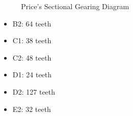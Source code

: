 \documentclass[11pt, oneside]{article}   	%
\theoremstyle{definition}
\begin{document}
\bigskip
\begin{figure}[H]
  \caption{Price's Sectional Gearing Diagram \cite{gears_from_the_greeks}}
  \label{fig:sectional_gearing}
\end{figure}
\bigskip
\bigskip
\bigskip
\begin{minipage}[c]{0.45\textwidth}
  \begin{itemize}
    \item B2: 64 teeth
    \item C1: 38 teeth
    \item C2: 48 teeth
    \item D1: 24 teeth
    \item D2: 127 teeth
    \item E2: 32 teeth
  \end{itemize}
\end{minipage}
\hfill
\end{document}
